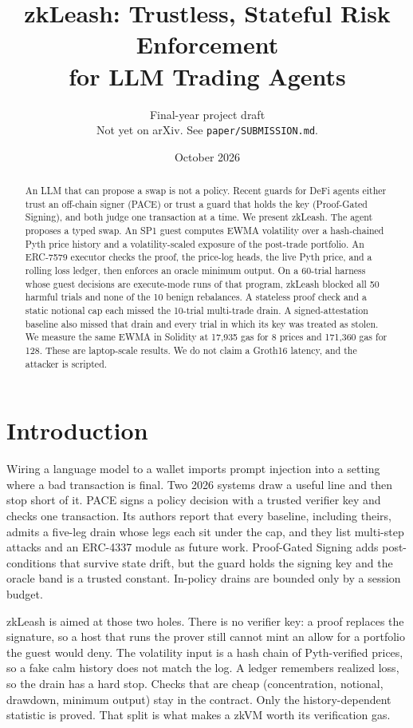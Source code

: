 \documentclass[11pt]{article}
\title{zkLeash: Trustless, Stateful Risk Enforcement\\for LLM Trading Agents}
\author{Final-year project draft\\[0.5em]\small Not yet on arXiv. See \texttt{paper/SUBMISSION.md}.}
\date{October 2026}
\begin{document}
\maketitle

\begin{abstract}
An LLM that can propose a swap is not a policy. Recent guards for DeFi agents either trust an off-chain signer (PACE) or trust a guard that holds the key (Proof-Gated Signing), and both judge one transaction at a time. We present zkLeash. The agent proposes a typed swap. An SP1 guest computes EWMA volatility over a hash-chained Pyth price history and a volatility-scaled exposure of the post-trade portfolio. An ERC-7579 executor checks the proof, the price-log heads, the live Pyth price, and a rolling loss ledger, then enforces an oracle minimum output. On a 60-trial harness whose guest decisions are execute-mode runs of that program, zkLeash blocked all 50 harmful trials and none of the 10 benign rebalances. A stateless proof check and a static notional cap each missed the 10-trial multi-trade drain. A signed-attestation baseline also missed that drain and every trial in which its key was treated as stolen. We measure the same EWMA in Solidity at 17{,}935 gas for 8 prices and 171{,}360 gas for 128. These are laptop-scale results. We do not claim a Groth16 latency, and the attacker is scripted.
\end{abstract}

\section{Introduction}

Wiring a language model to a wallet imports prompt injection into a setting where a bad transaction is final. Two 2026 systems draw a useful line and then stop short of it. PACE signs a policy decision with a trusted verifier key and checks one transaction. Its authors report that every baseline, including theirs, admits a five-leg drain whose legs each sit under the cap, and they list multi-step attacks and an ERC-4337 module as future work. Proof-Gated Signing adds post-conditions that survive state drift, but the guard holds the signing key and the oracle band is a trusted constant. In-policy drains are bounded only by a session budget.

zkLeash is aimed at those two holes. There is no verifier key: a proof replaces the signature, so a host that runs the prover still cannot mint an allow for a portfolio the guest would deny. The volatility input is a hash chain of Pyth-verified prices, so a fake calm history does not match the log. A ledger remembers realized loss, so the drain has a hard stop. Checks that are cheap (concentration, notional, drawdown, minimum output) stay in the contract. Only the history-dependent statistic is proved. That split is what makes a zkVM worth its verification gas.
\end{document}

